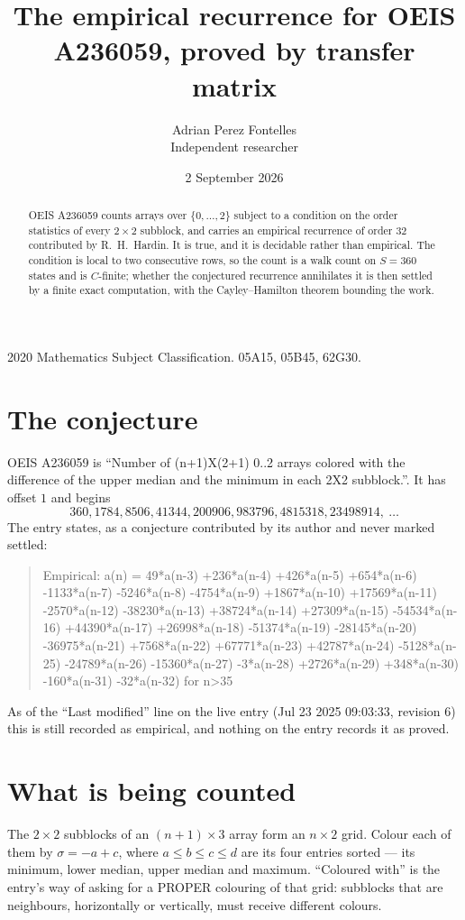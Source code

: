 \documentclass[11pt,a4paper]{article}
\title{The empirical recurrence for OEIS A236059, proved by transfer matrix}
\author{Adrian Perez Fontelles\\ \small Independent researcher}
\date{2 September 2026}
\theoremstyle{plain}
\theoremstyle{definition}
\begin{document}
\maketitle

\begin{abstract}
OEIS A236059 counts arrays over $\{0,\dots,2\}$ subject to a condition on the order
statistics of every $2\times2$ subblock, and carries an empirical recurrence of order
$32$ contributed by R.~H.~Hardin. It is true, and it is decidable rather than empirical.
The condition is local to two consecutive rows, so the count is a walk count on $S=360$
states and is $C$-finite; whether the conjectured recurrence annihilates it is then settled by
a finite exact computation, with the Cayley--Hamilton theorem bounding the work.
\end{abstract}

\noindent\small 2020 Mathematics Subject Classification. 05A15, 05B45, 62G30.\normalsize

\section{The conjecture}

OEIS A236059 is ``Number of (n+1)X(2+1) 0..2 arrays colored with the difference of the upper median and the minimum in each 2X2 subblock.''. It has offset $1$ and begins
\[
360, 1784, 8506, 41344, 200906, 983796, 4815318, 23498914,\ \dots
\]
The entry states, as a conjecture contributed by its author and never marked settled:
\begin{quote}
Empirical: a(n) = 49*a(n-3) +236*a(n-4) +426*a(n-5) +654*a(n-6) -1133*a(n-7) -5246*a(n-8) -4754*a(n-9) +1867*a(n-10) +17569*a(n-11) -2570*a(n-12) -38230*a(n-13) +38724*a(n-14) +27309*a(n-15) -54534*a(n-16) +44390*a(n-17) +26998*a(n-18) -51374*a(n-19) -28145*a(n-20) -36975*a(n-21) +7568*a(n-22) +67771*a(n-23) +42787*a(n-24) -5128*a(n-25) -24789*a(n-26) -15360*a(n-27) -3*a(n-28) +2726*a(n-29) +348*a(n-30) -160*a(n-31) -32*a(n-32) for n>35
\end{quote}
As of the ``Last modified'' line on the live entry (Jul 23 2025 09:03:33, revision 6) this is still
recorded as empirical, and nothing on the entry records it as proved.

\section{What is being counted}

The $2\times2$ subblocks of an $(n+1)\times3$ array form an
$n\times2$ grid. Colour each of them by $\sigma=-a+c$, where $a\le b\le c\le d$ are its four entries sorted --- its minimum, lower median, upper median and maximum. ``Coloured with'' is the entry's way of
asking for a PROPER colouring of that grid: subblocks that are neighbours, horizontally or
vertically, must receive different colours.
\end{document}
